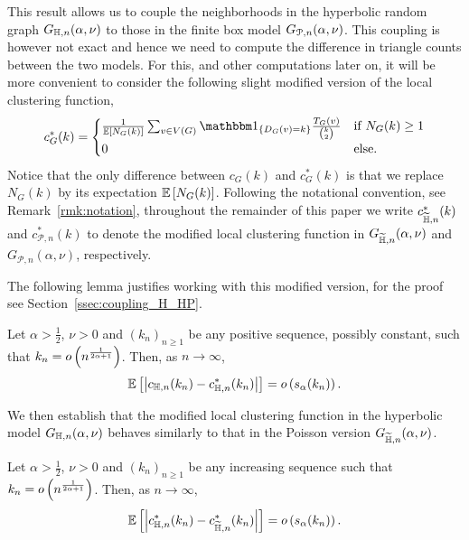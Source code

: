 This result allows us to couple the neighborhoods in the hyperbolic random graph $G_{\mathbb{H},n}(\alpha,\nu)$ to those in the finite box model $G_{{\mathcal P},n}(\alpha,\nu)$. This coupling is however not exact and hence we need to compute the difference in triangle counts between the two models. For this, and other computations later on, it will be more convenient to consider the following slight modified version of the local clustering function,
\begin{equation}\label{eq:def_local_clustering_ast_general}
	c_{G}^\ast(k) = \begin{cases}
			\frac{1}{\Exp{N_G(k)}} \sum_{v \in V(G)} \ind{D_G(v) = k} \frac{\T_G(v)}{\binom{k}{2}} &\mbox{if } N_G(k) \ge 1\\
			0 &\mbox{else.}
		\end{cases}
\end{equation}
Notice that the only difference between $c_G(k)$ and $c_G^\ast(k)$ is that we replace $N_G(k)$ by its expectation $\mathbb{E}\left[N_G(k)\right]$. Following the notational convention, see Remark~\ref{rmk:notation}, throughout the remainder of this paper we write $c_{\widetilde{\mathbb{H}},n}^\ast(k)$ and $c_{\mathcal{P},n}^\ast(k)$ to denote the modified local clustering function in $G_{\widetilde{\mathbb{H}},n}(\alpha, \nu)$ and $G_{\mathcal{P},n}(\alpha,\nu)$, respectively.

The following lemma justifies working with this modified version, for the proof see Section~\ref{ssec:coupling_H_HP}.

\begin{lemma}\label{lem:clustering_ast_H}
Let $\alpha > \frac{1}{2}$, $\nu > 0$ and $(k_n)_{n\ge 1}$ be any positive sequence, possibly constant, such that $k_n = o\left(n^{\frac{1}{2\alpha + 1}}\right)$. Then, as $n \to \infty$,
\[
	\mathbb{E}\left[\left|c_{\mathbb{H},n}(k_n) - c_{\mathbb{H},n}^\ast(k_n)\right|\right] = o\left(s_\alpha(k_n)\right).
\]
\end{lemma}

We then establish that the modified local clustering function in the hyperbolic model $G_{\mathbb{H},n}(\alpha,\nu)$ behaves similarly to that in the Poisson version $G_{\widetilde{\mathbb{H}}, n}(\alpha,\nu)$.

\begin{proposition}\label{prop:clustering_ast_H_Pois}
Let $\alpha > \frac{1}{2}$, $\nu > 0$ and $(k_n)_{n\ge 1}$ be any increasing sequence such that $k_n = o\left(n^{\frac{1}{2\alpha + 1}}\right)$. Then, as $n \to \infty$,
\[
	\mathbb{E}\left[\left|c_{\mathbb{H},n}^\ast(k_n) - c_{\widetilde{\mathbb{H}},n}^\ast(k_n)\right|\right] = o\left(s_\alpha(k_n)\right).
\]
\end{proposition}

